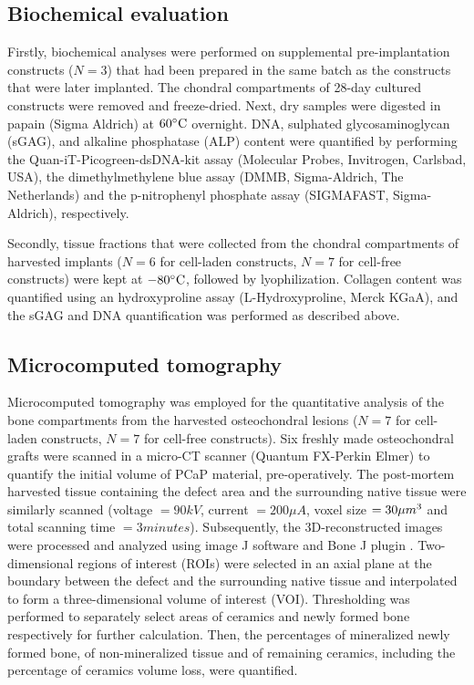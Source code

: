 \documentclass[twocolumn, serif, empirical, authordate, seplic]{jote-article}
\begin{document}
 {}\subsection*{Biochemical evaluation} 

Firstly, biochemical analyses were performed on supplemental pre-implantation constructs ($ N=3 $) that had been prepared in the same batch as the constructs that were later implanted. The chondral compartments of 28-day cultured constructs were removed and freeze-dried. Next, dry samples were digested in papain (Sigma Aldrich) at $60\degree \text{C}$ overnight. DNA, sulphated glycosaminoglycan (sGAG), and alkaline phosphatase (ALP) content were quantified by performing the Quan-iT-Picogreen-dsDNA-kit assay (Molecular Probes, Invitrogen, Carlsbad, USA), the dimethylmethylene blue assay (DMMB, Sigma-Aldrich, The Netherlands) and the p-nitrophenyl phosphate assay (SIGMAFAST\texttrademark, Sigma-Aldrich), respectively.

Secondly, tissue fractions that were collected from the chondral compartments of harvested implants ($ N=6 $ for cell-laden constructs, $ N=7 $ for cell-free constructs) were kept at $-80\degree \text{C}$, followed by lyophilization. Collagen content was quantified using an hydroxyproline assay (L-Hydroxyproline, Merck KGaA), and the sGAG and DNA quantification was performed as described above.

 {}\subsection*{Microcomputed tomography} 

Microcomputed tomography was employed for the quantitative analysis of the bone compartments from the harvested osteochondral lesions ($ N=7 $ for cell-laden constructs, $ N=7 $ for cell-free constructs). Six freshly made osteochondral grafts were scanned in a micro-CT scanner (Quantum FX-Perkin Elmer) to quantify the initial volume of PCaP material, pre-operatively. The post-mortem harvested tissue containing the defect area and the surrounding native tissue were similarly scanned (voltage $= 90 kV$, current $= 200 \mu A$, voxel size $= 30 \mu m\textsuperscript{3}$ and total scanning time $= 3 minutes$). Subsequently, the 3D-reconstructed images were processed and analyzed using image J software \parencite{Schindelin2012} and Bone J plugin \parencite{Doube2010}. Two-dimensional regions of interest (ROIs) were selected in an axial plane at the boundary between the defect and the surrounding native tissue and interpolated to form a three-dimensional volume of interest (VOI). Thresholding was performed to separately select areas of ceramics and newly formed bone respectively for further calculation. Then, the percentages of mineralized newly formed bone, of non-mineralized tissue and of remaining ceramics, including the percentage of ceramics volume loss, were quantified.
\end{document}
